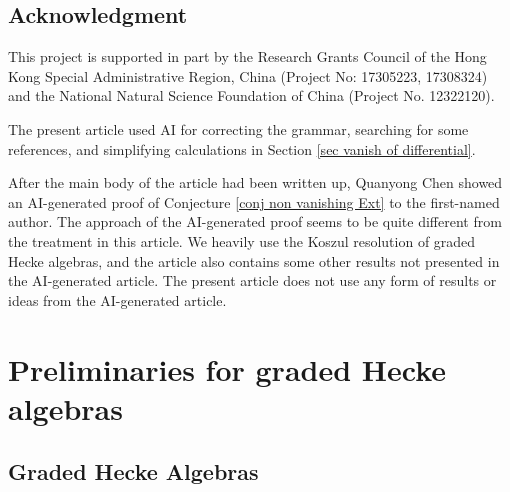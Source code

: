 \documentclass[11pt]{amsart}
\numberwithin{equation}{section}
\theoremstyle{definition}
\begin{document}
\subsection{Acknowledgment}
 This project is supported in part by the Research Grants Council of the Hong Kong Special Administrative Region, China (Project No: 17305223, 17308324) and the National Natural Science Foundation of China (Project No. 12322120). 

The present article used AI for correcting the grammar, searching for some references, and simplifying calculations in Section \ref{sec vanish of differential}. 

 After the main body of the article had been written up, Quanyong Chen showed an AI-generated proof of Conjecture \ref{conj non vanishing Ext} to the first-named author. The approach of the AI-generated proof seems to be quite different from the treatment in this article. We heavily use the Koszul resolution of graded Hecke algebras, and the article also contains some other results not presented in the AI-generated article. The present article does not use any form of results or ideas from the AI-generated article.



\section{Preliminaries for graded Hecke algebras}\label{Sec: Hecke alg}
\subsection{Graded Hecke Algebras}

\end{document}
